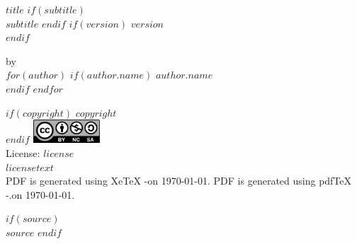 \documentclass[10pt, a4paper, titlepage, oneside, openright, final, article]{memoir}
\begin{document}
\frontmatter


%
%
\thispagestyle{empty}
\begin{flushleft}
    {\bfseries $title$}
    $if(subtitle)$
        {\\\itshape $subtitle$}
    $endif$
    $if(version)$
        \normalsize $version$\\
    $endif$
    \vspace*{1em}

    \normalsize by\\
    $for(author)$
        $if(author.name)$
            \normalsize $author.name$\\
        $endif$
    $endfor$

    \vspace*{1.5em}

    $if(copyright)$
        \normalsize $copyright$\\[1.2em]
    $endif$
    \includegraphics[keepaspectratio=true, width=2.5cm]{cc_by_nc_sa_40.eps}\\[1.2em]
    \normalsize License: $license$\\[1.2em]
    \normalsize $licensetext$\\[1.2em]

    \ifxetex
        \normalsize PDF is generated using XeTeX \the\eTeXversion\eTeXrevision-\the\XeTeXversion\XeTeXrevision\space on \today.
    \else
        \normalsize PDF is generated using pdfTeX \the\eTeXversion\eTeXrevision-\the\pdftexversion.\pdftexrevision\space on \today.
    \fi

    $if(source)$
        \\[1em]
        \normalsize $source$
    $endif$
\end{flushleft}
\pagebreak

\cleardoublepage

%
%
\end{document}
